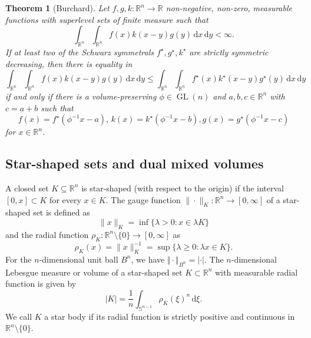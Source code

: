 \documentclass{amsart}
\newtheorem{theorem}{Theorem}
\newcommand{\gln}{\operatorname{GL}(n)}
\newcommand{\R}{\mathbb R}
\newcommand{\B}{{B^n}}
\newcommand{\sn}{{\mathbb S}^{n-1}}
\renewcommand{\d}{\,\mathrm{d}}
\newcommand{\vol}[1]{\vert #1\vert}
\begin{document}
\begin{theorem}[Burchard]
    \label{thm_burchard2}
    Let $f,g,k:\R^n \to \R$ non-negative, non-zero, measurable functions with superlevel sets of finite measure such that
    \begin{equation}
    \int_{\R^n}\int_{\R^n}  f(x) k(x-y) g(y) \d x \d y <\infty.
    \end{equation}
    If at least two of the Schwarz symmetrals $f^\star, g^\star, k^\star$ are strictly symmetric decreasing, then
    there is equality in
    \begin{equation}
          \int_{\R^n}\int_{\R^n}  f(x) k(x-y) g(y) \d x \d y \leq \int_{\R^n}\int_{\R^n}  f^\star(x) k^\star(x-y) g^\star(y) \d x \d y
    \end{equation}
    if and only if there is a volume-preserving $\phi\in\gln$ and $a,b,c\in\R^n$ with $c=a+b$ such that 
    \[f(x)=f^\star (\phi^{-1} x-a),\, k(x)=k^\star (\phi^{-1}x-b), g(x)=g^\star (\phi^{-1} x-c)\]
    for $x\in\R^n$.
\end{theorem}


\subsection{Star-shaped sets and dual mixed volumes}
A closed set $K \subseteq \R^n$ is star-shaped (with respect to the origin) if the interval $[0,x]\subset K$ for every $x\in K$. The gauge function $\|\cdot\|_K : \R^n \to [0,\infty]$ of a star-shaped set is defined as
\[\|x\|_K = \inf\{ \lambda > 0 : x \in \lambda K\}\]
and the radial function $\rho_K:\R^n \setminus\{0\} \to [0,\infty]$ as
\[\rho_K(x) = \|x\|_K^{-1} = \sup\{\lambda \geq 0:\lambda x \in K\}.\]
For the $n$-dimensional unit ball $\B$, we have $\Vert \cdot \Vert_{\B}=\vert\cdot \vert$. The $n$-dimensional Lebesgue measure or volume of a star-shaped set $K\subset\R^n$ with measurable radial function is given by
\[\vol{K}= \frac1 n \int_{\sn} \rho_K(\xi)^n\d \xi.\]
We call $K$ a star body if its radial function is strictly positive and continuous in $\R^n \setminus \{0\}$. 
\end{document}
